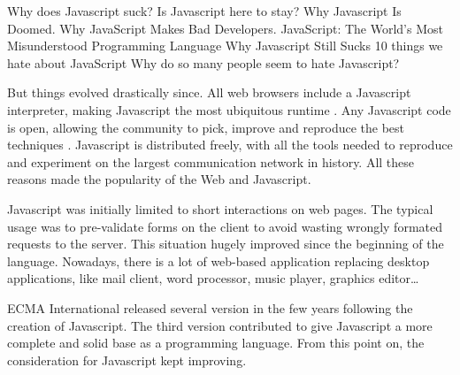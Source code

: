 
{
\fontsize{10pt}{10pt}\selectfont
Why does Javascript suck?
Is Javascript here to stay?
Why Javascript Is Doomed.
Why JavaScript Makes Bad Developers.
JavaScript: The World's Most Misunderstood Programming Language
Why Javascript Still Sucks
10 things we hate about JavaScript
Why do so many people seem to hate Javascript?
}

But things evolved drastically since.
All web browsers include a Javascript interpreter, making Javascript the most ubiquitous runtime \cite{Flanagan2006}.
Any Javascript code is open, allowing the community to pick, improve and reproduce the best techniques .
Javascript is distributed freely, with all the tools needed to reproduce and experiment on the largest communication network in history.
All these reasons made the popularity of the Web and Javascript.



Javascript was initially limited to short interactions on web pages.
The typical usage was to pre-validate forms on the client to avoid wasting wrongly formated requests to the server.
This situation hugely improved since the beginning of the language.
Nowadays, there is a lot of web-based application replacing desktop applications, like mail client, word processor, music player, graphics editor…

ECMA International released several version in the few years following the creation of Javascript.
The third version contributed to give Javascript a more complete and solid base as a programming language.
From this point on, the consideration for Javascript kept improving.

